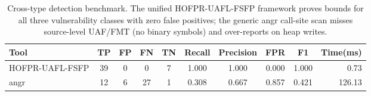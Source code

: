 \begin{table}[t]
\centering
\small
\begin{tabular}{lccccccccr}
\toprule
Tool & TP & FP & FN & TN & Recall & Precision & FPR & F1 & Time(ms) \\
\midrule
  HOFPR-UAFL-FSFP & 39 & 0 & 0 & 7 & 1.000 & 1.000 & 0.000 & 1.000 & 0.73 \\
  angr & 12 & 6 & 27 & 1 & 0.308 & 0.667 & 0.857 & 0.421 & 126.13 \\
\bottomrule
\end{tabular}
\caption{Cross-type detection benchmark. The unified HOFPR-UAFL-FSFP
framework proves bounds for all three vulnerability classes with zero
false positives; the generic angr call-site scan misses source-level
UAF/FMT (no binary symbols) and over-reports on heap writes.}
\label{tab:cross}
\end{table}
